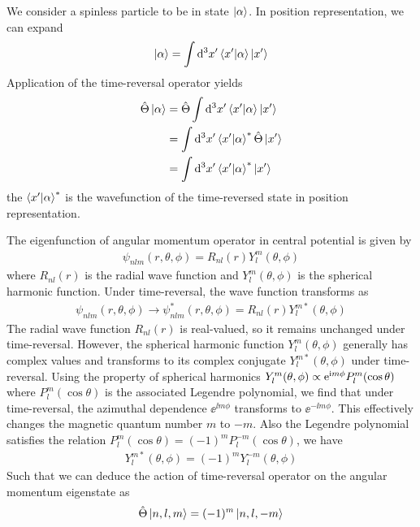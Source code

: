 We consider a spinless particle to be in state $\ket{\alpha}$. In position representation, we can expand 
\begin{align*}
    \ket{\alpha} = \int \mathrm{d}^3 x' \braket{x'|\alpha} \ket{x'}
\end{align*}
Application of the time-reversal operator yields 
\begin{align*}
    \hat{\Theta} \ket{\alpha} &= \hat{\Theta} \int \mathrm{d}^3 x' \braket{x'|\alpha} \ket{x'} \notag \\
    &= \int \mathrm{d}^3 x' \braket{x'|\alpha}^* \hat{\Theta} \ket{x'} \notag \\
    &= \int \mathrm{d}^3 x' \braket{x'|\alpha}^* \ket{x'}
\end{align*}
the $\braket{x'|\alpha}^*$ is the wavefunction of the time-reversed state in position representation. 

The eigenfunction of angular momentum operator in central potential is given by
\begin{align*}
    \psi_{n l m}(r, \theta, \phi) = R_{n l}(r) Y_{l}^m(\theta, \phi)
\end{align*}
where $R_{n l}(r)$ is the radial wave function and $Y_{l}^m(\theta, \phi)$ is the spherical harmonic function. Under time-reversal, the wave function transforms as
\begin{align*}
    \psi_{n l m}(r, \theta, \phi) \to \psi_{n l m}^*(r, \theta, \phi) = R_{n l}(r) Y_{l}^{m*}(\theta, \phi) 
\end{align*}
The radial wave function $R_{n l}(r)$ is real-valued, so it remains unchanged under time-reversal. However, the spherical harmonic function $Y_{l}^m(\theta, \phi)$ generally has complex values and transforms to its complex conjugate $Y_{l}^{m*}(\theta, \phi)$ under time-reversal.
Using the property of spherical harmonics $Y_{l}^{m}(\theta,\phi) \propto \mathrm{e}^{\mathrm{i} m \phi} P^{m}_l (\cos \theta)$ where $P^{m}_l (\cos \theta)$ is the associated Legendre polynomial, we find that under time-reversal, the azimuthal dependence $\ee^{\ii m \phi}$ transforms to $\ee^{-\ii m \phi}$. This effectively changes the magnetic quantum number $m$ to $-m$. Also the Legendre polynomial satisfies the relation $P^{m}_l (\cos \theta) = (-1)^m  P^{-m}_l (\cos \theta)$, we have
\begin{align*}
    Y_{l}^{m*}(\theta, \phi) = (-1)^m Y_{l}^{-m}(\theta, \phi)
\end{align*}
Such that we can deduce the action of time-reversal operator on the angular momentum eigenstate as
\begin{align}
    \hat{\Theta} \ket{n, l, m} = (-1)^m \ket{n ,l, -m} \label{eq:time_reversal_angular_momentum_eigenstate}
\end{align}

